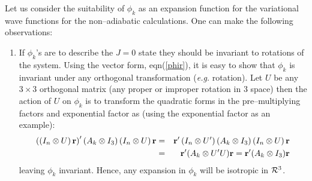 {{Let us
consider the suitability of $\phi_k$ as an expansion function for
the variational wave functions for the non--adiabatic calculations. 
One can make the following observations:

\begin{enumerate}


\item  
If $\phi_k$'s are to describe the $J=0$ state they
should be invariant to rotations 
of the system.
Using the vector form, 
eqn(\ref{phir}), it is easy to show that $\phi _k$ is
invariant under any orthogonal transformation
({\it e.g.} rotation).
Let $U$ be any $3\times 3$ 
orthogonal matrix (any proper or improper
rotation in 3 space) then the action 
of $U$ on $\phi_k$ is to transform the
quadratic forms in the pre--multiplying 
factors and exponential factor as
(using the exponential factor as an example): 
\begin{eqnarray}
\left( \left( I_n\otimes U\right) {\bf r}\right) ^{\prime }(A_k\otimes
I_3)\left( I_n\otimes U\right) {\bf r} &=&{\bf r}^{\prime }\left(
I_n\otimes U^{\prime }\right) (A_k\otimes I_3)\left( I_n\otimes U\right) 
{\bf r} \\
&=&{\bf r}^{\prime }(A_k\otimes U^{\prime }U){\bf r} 
= {\bf r}^{\prime }(A_k\otimes I_3){\bf r}
\end{eqnarray}
leaving $\phi_k$ invariant. Hence, any expansion in $\phi_k$ will be
isotropic in ${\cal R}^3$.





\end{enumerate}}}
